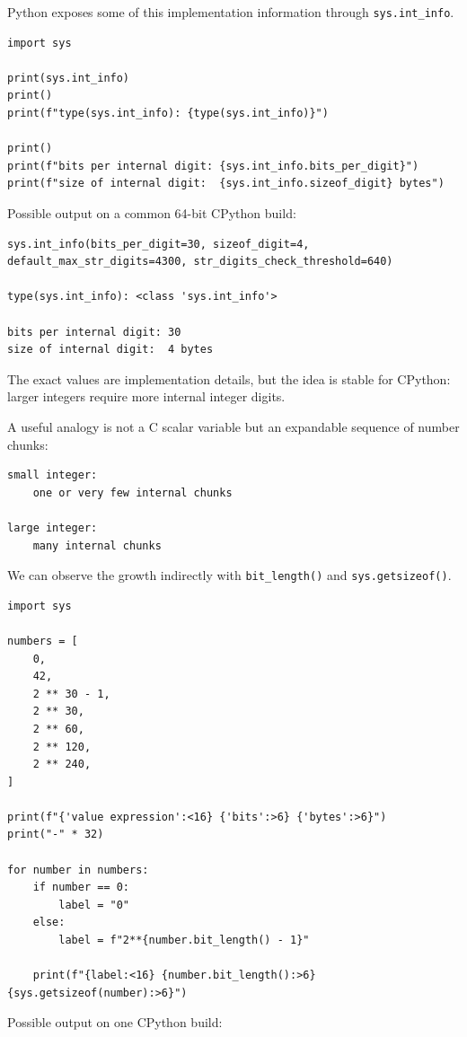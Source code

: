 Python exposes some of this implementation information through \texttt{sys.int\_info}.

\begin{verbatim}
import sys

print(sys.int_info)
print()
print(f"type(sys.int_info): {type(sys.int_info)}")

print()
print(f"bits per internal digit: {sys.int_info.bits_per_digit}")
print(f"size of internal digit:  {sys.int_info.sizeof_digit} bytes")
\end{verbatim}

Possible output on a common 64-bit CPython build:

\begin{verbatim}
sys.int_info(bits_per_digit=30, sizeof_digit=4, default_max_str_digits=4300, str_digits_check_threshold=640)

type(sys.int_info): <class 'sys.int_info'>

bits per internal digit: 30
size of internal digit:  4 bytes
\end{verbatim}

The exact values are implementation details, but the idea is stable for CPython: larger integers require more internal integer digits.

A useful analogy is not a C scalar variable but an expandable sequence of number chunks:

\begin{verbatim}
small integer:
    one or very few internal chunks

large integer:
    many internal chunks
\end{verbatim}

We can observe the growth indirectly with \texttt{bit\_length()} and \texttt{sys.getsizeof()}.

\begin{verbatim}
import sys

numbers = [
    0,
    42,
    2 ** 30 - 1,
    2 ** 30,
    2 ** 60,
    2 ** 120,
    2 ** 240,
]

print(f"{'value expression':<16} {'bits':>6} {'bytes':>6}")
print("-" * 32)

for number in numbers:
    if number == 0:
        label = "0"
    else:
        label = f"2**{number.bit_length() - 1}"

    print(f"{label:<16} {number.bit_length():>6} {sys.getsizeof(number):>6}")
\end{verbatim}

Possible output on one CPython build:

